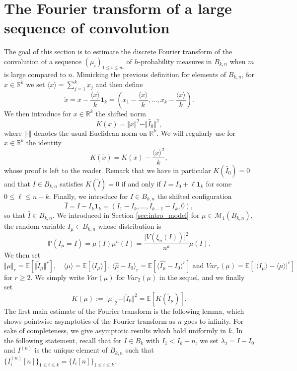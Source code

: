 \documentclass[10pt,11pt]{amsart}%
\begin{document}
 \section{The Fourier transform of a large sequence of convolution}\label{sec:Fourier_large_product}
The goal of this section is to estimate the discrete Fourier transform of the convolution of a sequence $(\mu_i)_{1\leq i\leq m}$ of $h$-probability measures in $B_{k,n}$ when $m$ is large compared to $n$. Mimicking the previous definition for elements of $B_{k,n}$, for $x\in \mathbb{R}^k$ we set $\langle x\rangle=\sum_{j=1}^kx_j$ and then define
$$\widetilde{x}=x-\frac{\langle x\rangle}{k}\mathbf{1}_k=\left(x_1-\frac{\langle x\rangle}{k},\ldots,x_k-\frac{\langle x\rangle}{k}\right).$$ 
We then introduce for $x\in \mathbb{R}^k$ the shifted norm 
$$K(x)=\Vert x\Vert^2-\Vert \tilde{I_0}\Vert^2,$$
where $\Vert\cdot\Vert$ denotes the usual Euclidean norm on $\mathbb{R}^k$. We will regularly use for $x\in\mathbb{R}^k$ the identity
\begin{equation}\label{eq:rho(tilde_I)}K\left(\tilde{x}\right)=K(x)-\frac{\langle x\rangle^2}{k},
\end{equation}
whose proof is left to the reader. Remark that we have in particular $K(\tilde{I_0})=0$ and that $I\in B_{k,n}$ satisfies $K(\tilde{I})=0$ if and only if $I=I_0+\ell\mathbf{1}_k$ for some $0\leq \ell\leq n-k$. Finally, we introduce for $I\in B_{k,n}$ the shifted configuration 
$$\hat{I}=I-I_k\mathbf{1}_k=(I_1-I_k,\ldots,I_{k-1}-I_k,0),$$
so that $\hat{I}\in B_{k,n}$.
We introduced in Section \ref{sec:intro_model} for $\mu\in \mathcal{M}_1(B_{k,n})$, the random variable $I_{\mu}\in B_{k,n}$ whose distribution is 
$$\mathbb{P}(I_{\mu}=I)=\mu(I)\mu^h(I)=\frac{\vert V(\xi_n(I))\vert^2}{n^k}\mu(I).$$
We then set 
\begin{equation}\label{eq:definition_moments}
\Vert\mu\Vert_r=\mathbb{E}\left[\Vert\tilde{I}_\mu\Vert^r\right],\quad \langle \mu\rangle=\mathbb{E}\left[\langle I_{\mu}\rangle\right],\,\langle\hat{\mu}-I_0\rangle_r=\mathbb{E}\left[\langle \widehat{I_{\mu}}-I_0\rangle^r\right]\text{ and } Var_{r}(\mu)=\mathbb{E}\left[\Big\vert\langle I_{\mu}\rangle-\langle \mu\rangle\Big\vert^r\right]
\end{equation}
for $r\geq 2$. We simply write $Var(\mu)$ for $Var_2(\mu)$ in the sequel, and we finally set 
$$K(\mu):=\Vert \mu\Vert_2-\Vert \tilde{I}_0\Vert^2=\mathbb{E}\left[K(\tilde{I}_{\mu})\right].$$
The first main estimate of the Fourier transform is the following lemma, which shows pointwise asymptotics of the Fourier transform as $n$ goes to infinity. For sake of completeness, we give asymptotic results which hold uniformly in $k$. In the following statement, recall that for $I\in B_{k}$ with $I_1<I_k+n$, we set $\lambda_I=I-I_0$ and $I^{(n)}$ is the unique element of $B_{k,n}$ such that $\{I^{(n)}_i[n]\}_{1\leq i\leq k}=\{I_i[n]\}_{1\leq i\leq k}$.
\end{document}
